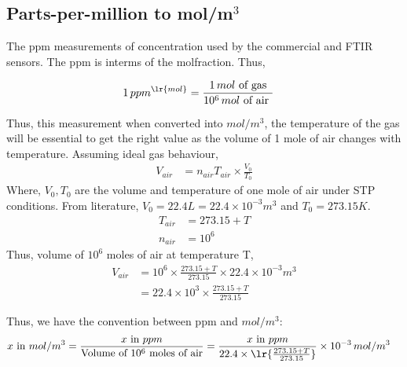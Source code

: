\subsection{Parts-per-million to mol/m$^3$}

The ppm measurements of concentration used by the commercial and FTIR sensors. The ppm is interms of the molfraction. Thus,

\begin{align}
    1 \, ppm^{\lr{mol}} &= \frac{1 \, mol \text{ of gas}}{10^6 \, mol \text{ of air }}
\end{align}

Thus, this measurement when converted into $mol/m^3$, the temperature of the gas will be essential to get the right value as the volume of 1 mole of air changes with temperature. Assuming ideal gas behaviour,
\begin{align*}
    V_{air} &= n_{air} T_{air} \times \frac{V_0}{T_0}
\end{align*}
Where, $V_0, T_0$ are the volume and temperature of one mole of air under STP conditions. From literature,
$V_0 = 22.4 L = 22.4 \times 10^{-3} m^3$ and $T_0 = 273.15 K$.
\begin{align*}
    T_{air} &= 273.15 + T\\
    n_{air} &= 10^6
\end{align*}
Thus, volume of $10^6$ moles of air at temperature T,
\begin{align*}
    V_{air} &= 10^6 \times \frac{273.15 + T}{273.15} \times 22.4 \times 10^{-3} m^3\\
            &= 22.4 \times 10^{3} \times \frac{273.15 + T}{273.15}
\end{align*}

Thus, we have the convention between ppm and $mol/m^3$:
\begin{align}
    x \text{ in } mol/m^3 &= \frac{x \text{ in } ppm }{\text{Volume of } 10^6 \text{ moles of air}}
                            = \frac{x \text{ in } ppm}{22.4 \times \lr{\frac{273.15 + T}{273.15}}}
                                \times 10^{-3} \, mol/m^3
\end{align}
